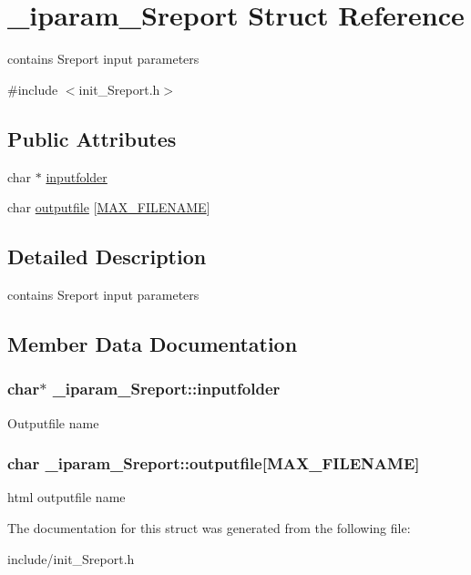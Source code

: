 \hypertarget{struct__iparam__Sreport}{\section{\+\_\+iparam\+\_\+\+Sreport Struct Reference}
\label{struct__iparam__Sreport}
}


contains Sreport input parameters  




{\ttfamily \#include $<$init\+\_\+\+Sreport.\+h$>$}

\subsection*{Public Attributes}
\begin{DoxyCompactItemize}
\item 
char $\ast$ \hyperlink{struct__iparam__Sreport_af5521a185f440566547b4b11b9fac6a4}{inputfolder}
\item 
char \hyperlink{struct__iparam__Sreport_aab71d9b5647daf65a8ba9ba6f7a35ee5}{outputfile} \mbox{[}\hyperlink{defines_8h_abe0ec333b60117063f9b9fd9f849cb08}{M\+A\+X\+\_\+\+F\+I\+L\+E\+N\+A\+M\+E}\mbox{]}
\end{DoxyCompactItemize}


\subsection{Detailed Description}
contains Sreport input parameters 

\subsection{Member Data Documentation}
\hypertarget{struct__iparam__Sreport_af5521a185f440566547b4b11b9fac6a4}{
\subsubsection[{inputfolder}]{\setlength{\rightskip}{0pt plus 5cm}char$\ast$ \+\_\+iparam\+\_\+\+Sreport\+::inputfolder}}\label{struct__iparam__Sreport_af5521a185f440566547b4b11b9fac6a4}
Outputfile name \hypertarget{struct__iparam__Sreport_aab71d9b5647daf65a8ba9ba6f7a35ee5}{
\subsubsection[{outputfile}]{\setlength{\rightskip}{0pt plus 5cm}char \+\_\+iparam\+\_\+\+Sreport\+::outputfile\mbox{[}{\bf M\+A\+X\+\_\+\+F\+I\+L\+E\+N\+A\+M\+E}\mbox{]}}}\label{struct__iparam__Sreport_aab71d9b5647daf65a8ba9ba6f7a35ee5}
html outputfile name 

The documentation for this struct was generated from the following file\+:\begin{DoxyCompactItemize}
\item 
include/init\+\_\+\+Sreport.\+h\end{DoxyCompactItemize}

